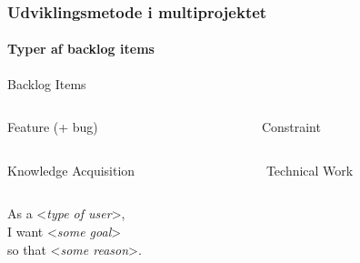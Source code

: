 \begin{frame}
    \frametitle{Udviklingsmetode i multiprojektet}
    \framesubtitle{Typer af backlog items}
      \begin{mtjbox}[backgroundcolor=color1!5, linecolor=color1!40]
        Backlog Items
        \begin{columns}
          \begin{column}{0.48\textwidth}
            \begin{mtjbox}
              Feature (+ bug)
            \end{mtjbox}
          \end{column}
          \begin{column}{0.48\textwidth}
            \begin{mtjbox}
              Constraint
            \end{mtjbox}
          \end{column}
        \end{columns}
        
        \begin{columns}
          \begin{column}{0.48\textwidth}
            \begin{mtjbox}
              Knowledge Acquisition
            \end{mtjbox}
          \end{column}
          \begin{column}{0.48\textwidth}
            \begin{mtjbox}
              Technical Work
            \end{mtjbox}
          \end{column}
        \end{columns}
      \end{mtjbox}
  \centering
  \vspace{.6cm}
  As a <\emph{type of user}>,\\I want <\emph{some goal}>\\so that <\emph{some reason}>.
\end{frame}
